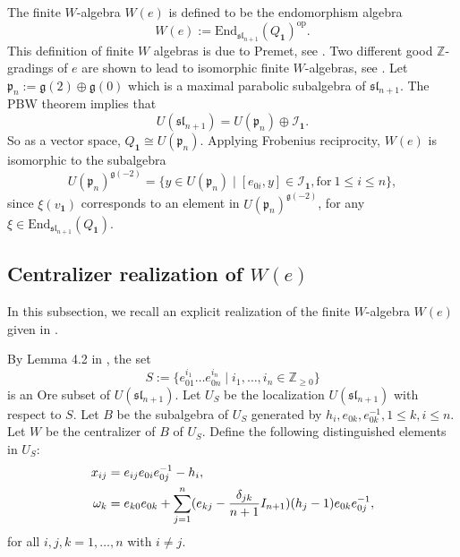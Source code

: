 \documentclass[12pt,a4paper]{amsart}
\numberwithin{equation}{section}
\newcommand{\Z}{\mathbb{Z}}
\def\mg{\mathfrak{g}}
\def\sl{\mathfrak{sl}}
\def\b1{\mathbf{1}}
\newcommand{\ch}{\mathcal{H}}
\begin{document}
The finite $W$-algebra $ W(e)$ is defined to be
the endomorphism algebra
$$W(e):= \text{End}_{\sl_{n+1}}(Q_{\b1} )^{\text{op}}. $$
This  definition of finite $W$ algebras is due to Premet, see \cite{Pr1}.
 Two different good $\Z$-gradings of $e$ are shown to lead to isomorphic finite
$W$-algebras, see \cite{BG}.
Let $\mathfrak{p}_n:=\mg(2)\oplus\mg(0)$ which is a maximal parabolic subalgebra of $\sl_{n+1}$. The PBW theorem implies that
$$U(\sl_{n+1}) =U(\mathfrak{p}_n)\oplus \mathcal{I}_{\b1} .$$
So as a vector space, $Q_{\b1}\cong U(\mathfrak{p}_n)$.
Applying Frobenius reciprocity, $W(e)$ is isomorphic to the
subalgebra
$$U(\mathfrak{p}_n)^{\mg(-2)}=\{y\in U(\mathfrak{p}_n)\mid
[e_{0i},y]\in \mathcal{I}_{\b1}, \text{for}\  1\leq i\leq n \},$$
since $\xi(v_\b1)$ corresponds to an element in $U(\mathfrak{p}_n)^{\mg(-2)}$,
for any $\xi\in \text{End}_{\sl_{n+1}}(Q_{\b1} )$.




\subsection{Centralizer realization of $W(e)$}
In this subsection, we  recall an explicit realization of the finite $W$-algebra $W(e)$ given in \cite{LL}.

By Lemma 4.2 in \cite{M}, the set
   $$S:=\{e_{01}^{i_1}\dots e_{0n}^{i_n}\mid i_1,\dots, i_n\in\Z_{\geq0}\}$$ is an Ore subset of $U(\sl_{n+1})$.
Let $U_{S}$ be the localization $U(\sl_{n+1})$ with respect to $S$. Let $B$ be the subalgebra of $U_{S}$ generated by $h_{i}, e_{0k}, e_{0k}^{-1}, 1\leq k,i\leq n$.
 Let $W$ be the centralizer of $B$ of $U_S$.
 Define the following distinguished elements in $U_S$:
 \begin{equation}\label{x-w-def}
 \aligned x_{ij}&=e_{ij}e_{0i}e_{0j}^{-1}-h_i,\\
 \omega_k&=e_{k0}e_{0k}+\sum_{j=1}^n
 (e _{kj}-\frac{\delta_{jk}}{n+1}I_{n+1})(h_j-1)e_{0k}e_{0j}^{-1}, \endaligned\end{equation}for all $i,j, k=1,\dots,n$ with
 $i\neq j$.
\end{document}
